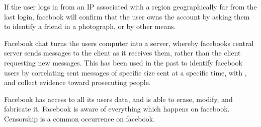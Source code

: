 If the user logs in from an IP associated with a region geographically far from
the last login, facebook will confirm that the user owns the account by asking
them to identify a friend in a photograph, or by other means.

Facebook chat turns the users computer into a server, whereby facebooks central
server sends messages to the client as it receives them, rather than the client
requesting new messages. This has been used in the past to identify facebook
users by correlating sent messages of specific size sent at a specific time, with
, and collect evidence toward prosecuting people. 

Facebook has access to all its users data, and is able to erase, modify, and
fabricate it. Facebook is aware of everything which happens on facebook.
Censorship is a common occurrence on facebook.
